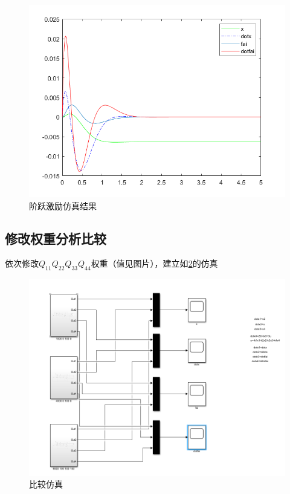 \documentclass{MathorCupmodeling}
\begin{document}
\begin{figure}[hbpt]
\centering
\includegraphics[width=12cm]{1000_100_2.png}
\caption{阶跃激励仿真结果}\label{1000_100_2}
\end{figure}

\subsection{修改权重分析比较}

依次修改$Q_{11}Q_{22}Q_{33}Q_{44}$权重（值见图片），建立如\cref{比较仿真}的仿真

\begin{figure}[hbpt]
\centering
\includegraphics[width=12cm]{比较仿真.png}
\caption{比较仿真}\label{比较仿真}
\end{figure}
\end{document}
